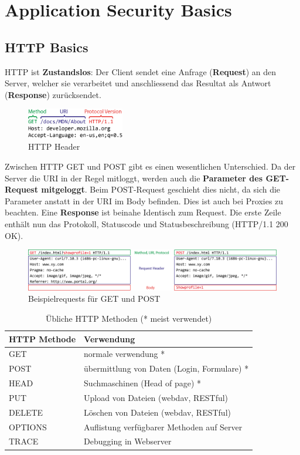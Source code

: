\section{Application Security Basics}

\subsection{HTTP Basics}

HTTP ist \textbf{Zustandslos}: Der Client sendet eine Anfrage (\textbf{Request}) an den Server, welcher sie verarbeitet und anschliessend das Resultat als Antwort (\textbf{Response}) zurücksendet.\\

\begin{figure}[H]
	\centering
	\includegraphics[width=0.38\textwidth]{./img/http-head}
	\caption{HTTP Header}
\end{figure}

Zwischen HTTP GET und POST gibt es einen wesentlichen Unterschied. Da der Server die URI in der Regel mitloggt, werden auch die \textbf{Parameter des GET-Request mitgeloggt}. Beim POST-Request geschieht dies nicht, da sich die Parameter anstatt in der URI im Body befinden. Dies ist auch bei Proxies zu beachten. Eine \textbf{Response} ist beinahe Identisch zum Request. Die erste Zeile enthält nun das Protokoll, Statuscode und Statusbeschreibung (HTTP/1.1 200 OK).

\begin{figure}[H]
	\centering
	\includegraphics[width=\textwidth]{./img/http-full-request}
	\caption{Beispielrequests für GET und POST}
\end{figure}

\begin{table}[H]
	\begin{tabularx}{\textwidth}{l|X}
		\textbf{HTTP Methode} & \textbf{Verwendung}\\ \hline
		GET		& normale verwendung *\\ \hline
		POST	& übermittlung von Daten (Login, Formulare) *\\ \hline
		HEAD	& Suchmaschinen (Head of page) *\\ \hline
		PUT		& Upload von Dateien (webdav, RESTful)\\ \hline
		DELETE	& Löschen von Dateien (webdav, RESTful)\\ \hline
		OPTIONS	& Auflistung verfügbarer Methoden auf Server\\ \hline
		TRACE	& Debugging in Webserver\\ \hline
	\end{tabularx}
	\caption{Übliche HTTP Methoden (* meist verwendet)}
\end{table}


